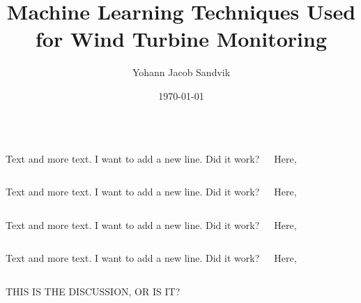 \documentclass[18pt, a3paper, portrait]{tikzposter}
\title{Machine Learning Techniques Used for Wind Turbine Monitoring}
\author{Yohann Jacob Sandvik}
\date{\today}
\institute{Institute of Electronic Systems - NTNU}
\begin{document}
 
\maketitle 

\begin{columns}
    {
        Text and more text. I want to add a new line. \newline
        Did it work?
        \vspace{4cm}
    }
 
    {
        Here,  
        \vspace{4cm}
    }
\end{columns}

\begin{columns}
    {
        Text and more text. I want to add a new line. \newline
        Did it work?
        \vspace{4cm}
    }
 
    {
        Here,  
        \vspace{4cm}
    }
\end{columns}

\begin{columns}
    {
        Text and more text. I want to add a new line. \newline
        Did it work?
        \vspace{4cm}
    }
 
    {
        Here,  
        \vspace{4cm}
    }
\end{columns}

\begin{columns}
    {
        Text and more text. I want to add a new line. \newline
        Did it work?
        \vspace{4cm}
    }
 
    {
        Here,  
        \vspace{4cm}
    }
\end{columns}

{
    THIS IS THE DISCUSSION, OR IS IT?
}
\end{document}
